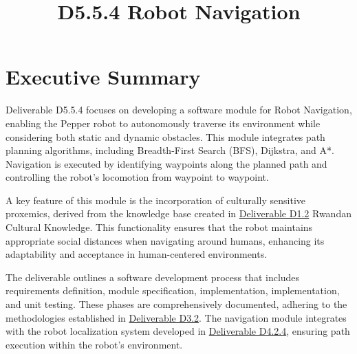 \documentclass{CSSRforAfrica}
\begin{document}



\title{D5.5.4 Robot Navigation}   




\maketitle

\section*{Executive Summary}
\label{executive_summary}

Deliverable D5.5.4 focuses on developing a software module for Robot Navigation, enabling the Pepper robot to autonomously traverse its environment while considering both static and dynamic obstacles. This module integrates path planning algorithms, including Breadth-First Search (BFS), Dijkstra, and A*. Navigation is executed by identifying waypoints along the planned path and controlling the robot's locomotion from waypoint to waypoint.

\noindent A key feature of this module is the incorporation of culturally sensitive proxemics, derived from the knowledge base created in \href{https://cssr4africa.github.io/deliverables/CSSR4Africa_Deliverable_D1.2.pdf}{Deliverable D1.2} Rwandan Cultural Knowledge. This functionality ensures that the robot maintains appropriate social distances when navigating around humans, enhancing its adaptability and acceptance in human-centered environments.

\noindent The deliverable outlines a software development process that includes requirements definition, module specification, implementation, implementation, and unit testing. These phases are comprehensively documented, adhering to the methodologies established in \href{https://cssr4africa.github.io/deliverables/CSSR4Africa_Deliverable_D3.2.pdf}{Deliverable D3.2}. The navigation module integrates with the robot localization system developed in \href{https://cssr4africa.github.io/deliverables/CSSR4Africa_Deliverable_D4.2.4.pdf}{Deliverable D4.2.4}, ensuring path execution within the robot's environment.
\end{document}
